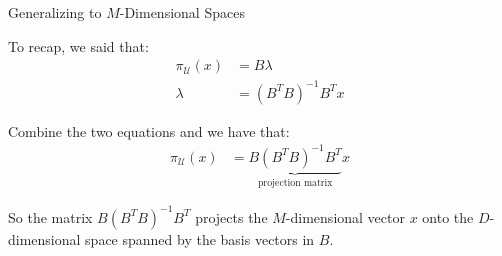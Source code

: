 \begin{frame}{Generalizing to $M$-Dimensional Spaces}

    To recap, we said that:
    \begin{align*}
        \pi_{\mathcal{U}}(x) &= B \lambda
        \\
        \lambda &= (B^T B)^{-1} B^T x
    \end{align*}

    Combine the two equations and we have that:
    \begin{align*}
        \pi_{\mathcal{U}}(x) &= \underbrace{B (B^T B)^{-1} B^T}_{\text{projection matrix}} x
    \end{align*}

    So the matrix $B (B^T B)^{-1} B^T$ projects the $M$-dimensional vector $x$ onto the $D$-dimensional space spanned by the basis vectors in $B$.
    
\end{frame}